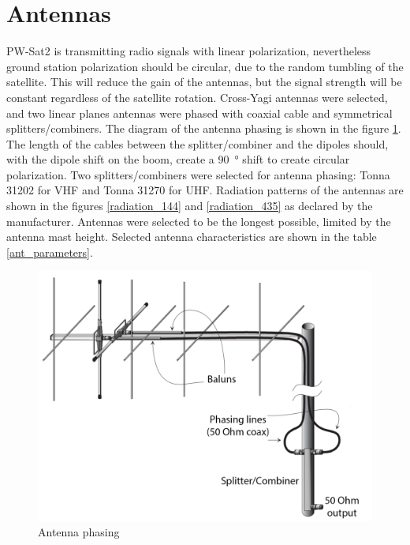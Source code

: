 \section{Antennas}
PW-Sat2 is transmitting radio signals with linear polarization, nevertheless ground station  polarization should be circular, due to the random tumbling of the satellite. This will reduce the gain of the antennas, but the signal strength will be constant regardless of the satellite rotation. Cross-Yagi antennas were selected, and two linear planes antennas were phased with coaxial cable and symmetrical splitters/combiners. The diagram of the antenna phasing is shown in the figure \ref{antenna_phasing_diagram}. The length of the cables between the splitter/combiner and the dipoles should, with the dipole shift on the boom, create a \SI{90}{\degree} shift to create circular polarization. Two splitters/combiners were selected for antenna phasing: Tonna 31202 for VHF and Tonna 31270 for UHF. Radiation patterns of the antennas are shown in the figures \ref{radiation_144} and \ref{radiation_435} as declared by the manufacturer. Antennas were selected to be the longest possible, limited by the antenna mast height. Selected antenna characteristics are shown in the table \ref{ant_parameters}.

\begin{figure}
    \centering
    \includegraphics[width=0.5\paperwidth]{img/7/antenna_phasing_diagram.png}
    \caption{Antenna phasing}
    \label{antenna_phasing_diagram}
\end{figure}

